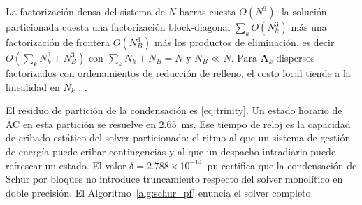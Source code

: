 \begin{proposition}[complejidad]
\label{prop:complexity}
La factorización densa del sistema de $N$ barras cuesta $O(N^3)$; la solución particionada cuesta una factorización block-diagonal $\sum_k O(N_k^3)$ más una factorización de frontera $O(N_B^3)$ más los productos de eliminación, es decir $O\!\left(\sum_k N_k^3 + N_B^3\right)$ con $\sum_k N_k + N_B = N$ y $N_B \ll N$. Para $\mathbf{A}_k$ dispersos factorizados con ordenamientos de reducción de relleno, el costo local tiende a la linealidad en $N_k$ \cite{george1973}, \cite{saad2003}.
\end{proposition}

El residuo de partición de la condensación es \eqref{eq:trinity}. Un estado horario de AC en esta partición se resuelve en 2.65~ms. Ese tiempo de reloj es la capacidad de cribado estático del solver particionado: el ritmo al que un sistema de gestión de energía puede cribar contingencias y al que un despacho intradiario puede refrescar un estado. El valor $\delta = 2.788 \times 10^{-14}$~pu certifica que la condensación de Schur por bloques no introduce truncamiento respecto del solver monolítico en doble precisión. El Algoritmo~\ref{alg:schur_pf} enuncia el solver completo.

